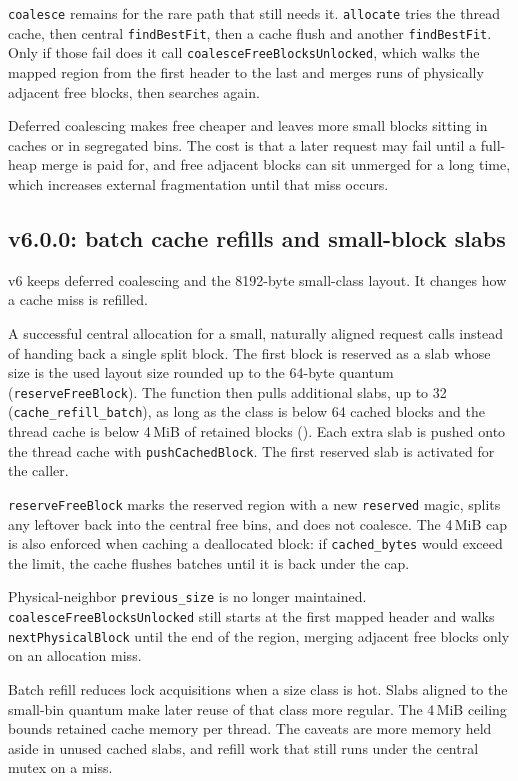 \texttt{coalesce} remains for the rare path that still needs it.
\texttt{allocate} tries the thread cache, then central \texttt{findBestFit}, then
a cache flush and another \texttt{findBestFit}.
Only if those fail does it call \texttt{coalesceFreeBlocksUnlocked}, which walks
the mapped region from the first header to the last and merges runs of
physically adjacent free blocks, then searches again.

Deferred coalescing makes free cheaper and leaves more small blocks sitting in
caches or in segregated bins.
The cost is that a later request may fail until a full-heap merge is paid for,
and free adjacent blocks can sit unmerged for a long time, which increases
external fragmentation until that miss occurs.

\subsection{v6.0.0: batch cache refills and small-block slabs}

v6 keeps deferred coalescing and the 8192-byte small-class layout.
It changes how a cache miss is refilled.

A successful central allocation for a small, naturally aligned request calls
 instead of handing back a single split block.
The first block is reserved as a slab whose size is the used layout size rounded
up to the 64-byte quantum (\texttt{reserveFreeBlock}).
The function then pulls additional slabs, up to 32
(\texttt{cache\_refill\_batch}), as long as the class is below 64 cached blocks
and the thread cache is below 4\,MiB of retained blocks
().
Each extra slab is pushed onto the thread cache with
\texttt{pushCachedBlock}.
The first reserved slab is activated for the caller.

\texttt{reserveFreeBlock} marks the reserved region with a new
\texttt{reserved} magic, splits any leftover back into the central free bins,
and does not coalesce.
The 4\,MiB cap is also enforced when caching a deallocated block: if
\texttt{cached\_bytes} would exceed the limit, the cache flushes batches until
it is back under the cap.

Physical-neighbor \texttt{previous\_size} is no longer maintained.
\texttt{coalesceFreeBlocksUnlocked} still starts at the first mapped header and
walks \texttt{nextPhysicalBlock} until the end of the region, merging adjacent
free blocks only on an allocation miss.

Batch refill reduces lock acquisitions when a size class is hot.
Slabs aligned to the small-bin quantum make later reuse of that class more
regular.
The 4\,MiB ceiling bounds retained cache memory per thread.
The caveats are more memory held aside in unused cached slabs, and refill work
that still runs under the central mutex on a miss.

